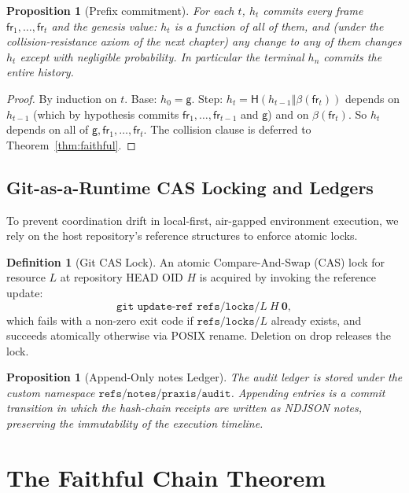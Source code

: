 \documentclass[11pt,oneside]{book}
\theoremstyle{definition}
\newtheorem{definition}{Definition}[chapter]
\theoremstyle{plain}
\newtheorem{proposition}[theorem]{Proposition}
\theoremstyle{remark}
\newcommand{\chainH}{\mathsf{H}}               %
\newcommand{\fr}{\mathsf{fr}}                   %
\newcommand{\body}{\beta}                       %
\newcommand{\code}[1]{\texttt{#1}}
\newcommand{\concat}{\mathbin{\Vert}}           %
\newcommand{\Genesis}{\mathsf{g}}               %
\begin{document}
\begin{proposition}[Prefix commitment]\label{prop:prefix}
For each $t$, $h_t$ commits every frame $\fr_1,\dots,\fr_t$ and the genesis value: $h_t$ is a
function of all of them, and (under the collision-resistance axiom of the next chapter) any
change to any of them changes $h_t$ except with negligible probability. In particular the
terminal $h_n$ commits the entire history.
\end{proposition}

\begin{proof}
By induction on $t$. Base: $h_0=\Genesis$. Step: $h_t=\chainH(h_{t-1}\concat\body(\fr_t))$
depends on $h_{t-1}$ (which by hypothesis commits $\fr_1,\dots,\fr_{t-1}$ and $\Genesis$) and
on $\body(\fr_t)$. So $h_t$ depends on all of $\Genesis,\fr_1,\dots,\fr_t$. The collision
clause is deferred to Theorem~\ref{thm:faithful}. \end{proof}

\section{Git-as-a-Runtime CAS Locking and Ledgers}

To prevent coordination drift in local-first, air-gapped environment execution, we rely on the host repository's reference structures to enforce atomic locks.

\begin{definition}[Git CAS Lock]\label{def:gitlock}
An atomic Compare-And-Swap (CAS) lock for resource $L$ at repository HEAD OID $H$ is acquired by invoking the reference update:
\begin{equation}\label{eq:gitlock}
\code{git update-ref refs/locks/}L\ H\ \bm 0,
\end{equation}
which fails with a non-zero exit code if $\code{refs/locks/}L$ already exists, and succeeds atomically otherwise via POSIX rename. Deletion on drop releases the lock.
\end{definition}

\begin{proposition}[Append-Only notes Ledger]\label{prop:notesledger}
The audit ledger is stored under the custom namespace $\code{refs/notes/praxis/audit}$. Appending entries is a commit transition in which the hash-chain receipts are written as NDJSON notes, preserving the immutability of the execution timeline.
\end{proposition}

\chapter{The Faithful Chain Theorem}
\label{ch:faithful}
\end{document}
